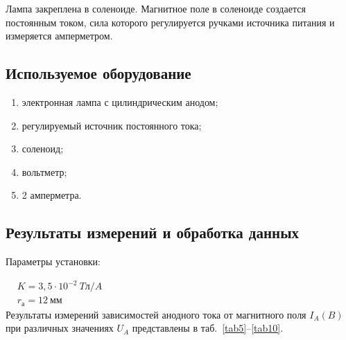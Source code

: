 \documentclass[a4paper, 12pt]{article}
\begin{document}
Лампа закреплена в соленоиде. Магнитное поле в соленоиде создается постоянным током, сила которого регулируется ручками источника питания и измеряется амперметром.

\subsection{Используемое оборудование}

\begin{enumerate}
    \item электронная лампа с цилиндрическим анодом;
    \item регулируемый источник постоянного тока;
    \item соленоид;
    \item вольтметр;
    \item 2 амперметра.
\end{enumerate}

\subsection{Результаты измерений и обработка данных}

Параметры установки:

$\begin{aligned}
& K = 3,5 \cdot 10^{-2}~Tл/A\\
& r_а = 12~мм
\end{aligned}$\\[0,5 cm]

Результаты измерений зависимостей анодного тока от магнитного поля $I_A(B)$ при различных значениях $U_A$ представлены в таб.~\ref{tab5}--\ref{tab10}.

\vspace{5cm}
\end{document}
